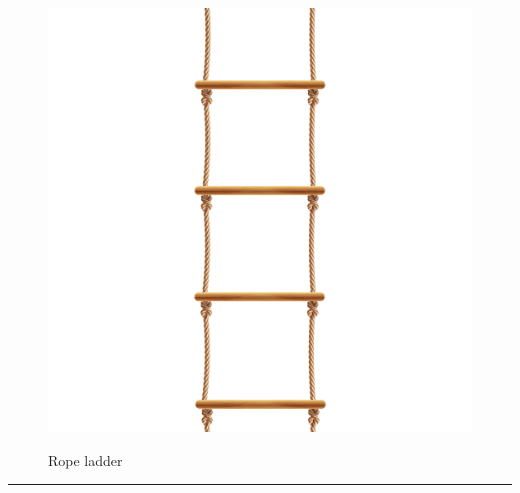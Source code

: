 \documentclass{article}
\begin{document}
    \begin{figure}[H]
        \centering
        \begin{minipage}{0.25\textwidth}
            \centering
            \includegraphics[width=\textwidth]{../SurvivalItemImages/ropeladder}
        \end{minipage}\hfill
        \begin{minipage}{0.7\textwidth}
            \centering
            \Large Rope ladder
        \end{minipage}
    \end{figure}
    \vspace{-0.8em}
    \noindent\rule{\textwidth}{0.4pt}
            
\end{document}
